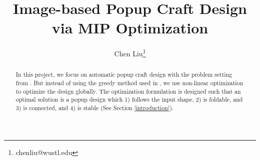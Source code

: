 \documentclass{acmsiggraph}
\title{Image-based Popup Craft Design via MIP Optimization}
\author{Chen Liu\thanks{chenliu@wustl.edu}}
\begin{document}


\maketitle

\begin{abstract}

  In this project, we focus on automatic popup craft design with the problem setting from \cite{liu2014image}. But instead of using the greedy method used in \cite{liu2014image}, we use non-linear optimization to optimize the design globally. The optimization formulation is designed such that an optimal solution is a popup design which 1) follows the input shape, 2) is foldable, and 3) is connected, and 4) is stable (See Section \ref{introduction}).
\end{abstract}

% 
% 
















\nocite{*}

\end{document}

